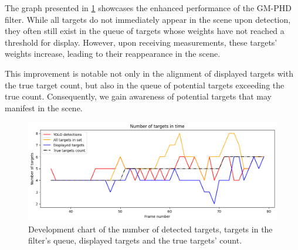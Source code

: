 The graph presented in \ref{gr:E1-V1-S1} showcases the enhanced performance of the GM-PHD filter. While all
targets do not immediately appear in the scene upon detection, they often still exist in the queue of targets
whose weights
have
not reached a threshold for display. However, upon receiving measurements, these targets' weights increase, leading to their reappearance in the scene.

This improvement is notable not only in the alignment of displayed targets with the true target count, but also in
the queue of potential targets exceeding the true count. Consequently, we gain awareness of potential targets that may manifest in the scene.


\begin{figure}[H]
    \centering
    \includegraphics[width=\linewidth]{../../../experiments/E1/V1/YOLO/yolo_det}
    \caption{Development chart of the number of detected targets, targets in the filter's queue, displayed targets and
    the true
    targets' count.}
    \label{gr:E1-V1-S1}
\end{figure}

